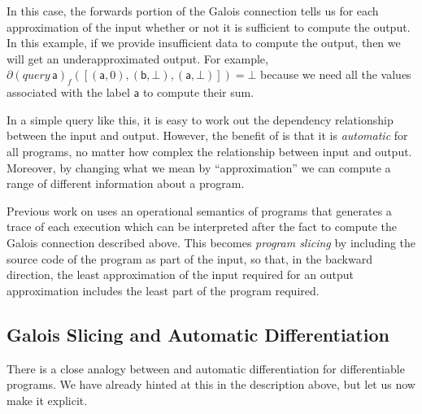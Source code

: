 \begin{example}
  In this case, the forwards portion of the Galois connection tells us for each approximation of the input whether or not it is sufficient to compute the output. In this example, if we provide insufficient data to compute the output, then we will get an underapproximated output. For example, $\partial (\mathit{query}\, \mathsf{a})_f([(\mathsf{a},0),(\mathsf{b},\bot),(\mathsf{a},\bot)]) = \bot$ because we need all the values associated with the label $\mathsf{a}$ to compute their sum.

  In a simple query like this, it is easy to work out the dependency relationship between the input and output. However, the benefit of \GPS is that it is {\em automatic} for all programs, no matter how complex the relationship between input and output. Moreover, by changing what we mean by ``approximation'' we can compute a range of different information about a program.
\end{example}

Previous work on \GPS uses an operational semantics of programs that generates a trace of each execution which can be interpreted after the fact to compute the Galois connection described above. This becomes {\em program slicing} by including the source code of the program as part of the input, so that, in the backward direction, the least approximation of the input required for an output approximation includes the least part of the program required.



\subsection{Galois Slicing and Automatic Differentiation}

There is a close analogy between \GPS and automatic differentiation for differentiable programs. We have already hinted at this in the description above, but let us now make it explicit.

